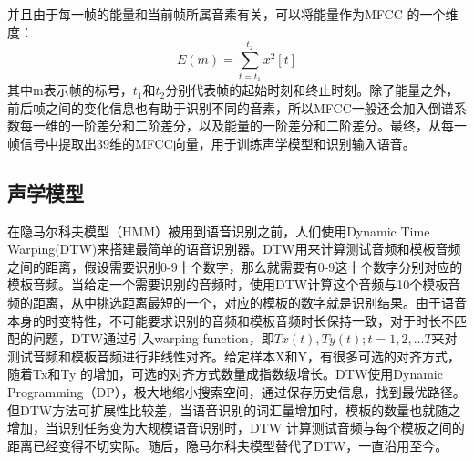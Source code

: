 并且由于每一帧的能量和当前帧所属音素有关，可以将能量作为MFCC 的一个维度：\begin{equation}E(m) = \sum_{t=t_1}^{t_2} x^2[t]\end{equation}
其中m表示帧的标号，$t_1$和$t_2$分别代表帧的起始时刻和终止时刻。除了能量之外，前后帧之间的变化信息也有助于识别不同的音素，所以MFCC一般还会加入倒谱系数每一维的一阶差分和二阶差分，以及能量的一阶差分和二阶差分。最终，从每一帧信号中提取出39维的MFCC向量，用于训练声学模型和识别输入语音。
\subsection{声学模型}\label{acoustic model introduction}
在隐马尔科夫模型（HMM）被用到语音识别之前，人们使用Dynamic Time Warping(DTW)\cite{sakoe1978dynamic}来搭建最简单的语音识别器。DTW用来计算测试音频和模板音频之间的距离，假设需要识别0-9十个数字，那么就需要有0-9这十个数字分别对应的模板音频。当给定一个需要识别的音频时，使用DTW计算这个音频与10个模板音频的距离，从中挑选距离最短的一个，对应的模板的数字就是识别结果。由于语音本身的时变特性，不可能要求识别的音频和模板音频时长保持一致，对于时长不匹配的问题，DTW通过引入warping function，即$Tx(t), Ty(t);t=1,2,...T$来对测试音频和模板音频进行非线性对齐。给定样本X和Y，有很多可选的对齐方式，随着Tx和Ty 的增加，可选的对齐方式数量成指数级增长。DTW使用Dynamic Programming（DP），极大地缩小搜索空间，通过保存历史信息，找到最优路径。但DTW方法可扩展性比较差，当语音识别的词汇量增加时，模板的数量也就随之增加，当识别任务变为大规模语音识别时，DTW 计算测试音频与每个模板之间的距离已经变得不切实际。随后，隐马尔科夫模型替代了DTW，一直沿用至今。

